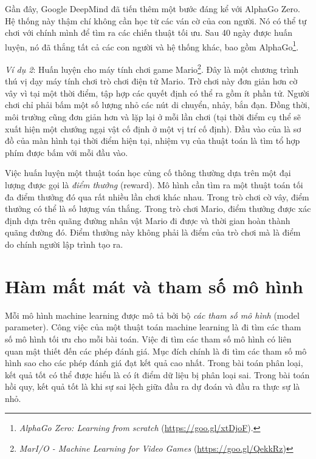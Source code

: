Gần đây, Google DeepMind đã tiến thêm một bước đáng kể với AlphaGo Zero. Hệ
thống này thậm chí không cần học từ các ván cờ của con người. Nó có thể tự chơi
với chính mình để tìm ra các chiến thuật tối ưu. Sau 40 ngày được huấn luyện, nó
đã thắng tất cả các con người và hệ thống khác, bao gồm
AlphaGo\footnote{\textit{AlphaGo Zero: Learning from scratch}
(\url{https://goo.gl/xtDjoF}).}.

\textit{Ví dụ 2}: {Huấn luyện cho máy tính chơi game
Mario}\footnote{\textit{MarI/O - Machine Learning for Video Games}
(\url{https://goo.gl/QekkRz})}. Đây là một chương trình thú vị dạy máy tính chơi
trò chơi điện tử Mario. Trờ chơi này đơn giản hơn cờ vây vì tại một thời điểm,
tập hợp các quyết định có thể ra gồm ít phần tử. Người chơi chỉ phải bấm một số
lượng nhỏ các nút di chuyển, nhảy, bắn đạn. Đồng thời, môi trường cũng đơn giản
hơn và lặp lại ở mỗi lần chơi (tại thời điểm cụ thể sẽ xuất hiện một chướng ngại
vật cố định ở một vị trí cố định). Đầu vào của là sơ đồ của màn hình tại thời
điểm hiện tại, nhiệm vụ của thuật toán là tìm tổ hợp phím được bấm với mỗi đầu
vào.

Việc huấn luyện một thuật toán học củng cố thông thường dựa trên một đại lượng
được gọi là \textit{điểm thưởng} (reward). Mô hình cần tìm ra một thuật toán tối đa điểm
thưởng đó qua rất nhiều lần chơi khác nhau. Trong trò chơi cờ vây, điểm thưởng
có thể là số lượng ván thắng. Trong trò chơi Mario, điểm thưởng được xác định
dựa trên quãng đường nhân vật Mario đi được và thời gian hoàn thành quãng đường
đó. Điểm thưởng này không phải là điểm của trò chơi mà là điểm do chính người
lập trình tạo ra.


\section{Hàm mất mát và tham số mô hình}

Mỗi mô hình machine learning được mô tả bởi bộ \textit{các tham số mô hình} (model parameter).
Công việc của một thuật toán machine learning là đi tìm các tham số mô hình tối
ưu cho mỗi bài toán. Việc đi tìm các tham số mô hình có liên quan mật thiết đến
các phép đánh giá. Mục đích chính là đi tìm các tham số mô hình sao cho
các phép đánh giá đạt kết quả cao nhất. Trong bài toán phân loại, kết quả
tốt có thể được hiểu là có ít điểm dữ liệu bị phân loại sai. Trong bài toán
hồi quy, kết quả tốt là khi sự sai lệch giữa đầu ra dự đoán và đầu ra thực sự
là nhỏ.

